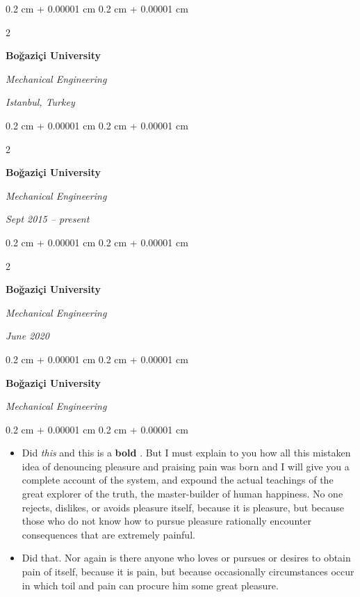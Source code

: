 \documentclass[10pt, letterpaper]{article}
\newenvironment{highlights}{
    \begin{itemize}[
        topsep=0.10 cm,
        parsep=0.10 cm,
        partopsep=0pt,
        itemsep=0pt,
        leftmargin=0.4 cm + 10pt
    ]
}{
    \end{itemize}
} %
\newenvironment{onecolentry}{
    \begin{adjustwidth}{
        0.2 cm + 0.00001 cm
    }{
        0.2 cm + 0.00001 cm
    }
}{
    \end{adjustwidth}
} %
\newenvironment{twocolentry}[2][]{
    \onecolentry
    \def\secondColumn{#2}
    \setcolumnwidth{\fill, 4.5 cm}
    \begin{paracol}{2}
}{
    \switchcolumn \raggedleft \secondColumn
    \end{paracol}
    \endonecolentry
} %
\let\hrefWithoutArrow\href
\renewcommand{\href}[2]{\hrefWithoutArrow{#1}{\ifthenelse{\equal{#2}{}}{ }{#2 }\raisebox{.15ex}{\footnotesize \faExternalLink*}}}
\begin{document}
        \vspace{0.2 cm}

        \begin{twocolentry}{
        \textit{Istanbul, Turkey}    
            
        }
            \textbf{Boğaziçi University}

            \textit{Mechanical Engineering}
        \end{twocolentry}



        \vspace{0.2 cm}

        \begin{twocolentry}{
            
            
        \textit{Sept 2015 – present}}
            \textbf{Boğaziçi University}

            \textit{Mechanical Engineering}
        \end{twocolentry}



        \vspace{0.2 cm}

        \begin{twocolentry}{
            
            
        \textit{June 2020}}
            \textbf{Boğaziçi University}

            \textit{Mechanical Engineering}
        \end{twocolentry}



        \vspace{0.2 cm}

        \begin{onecolentry}
            \textbf{Boğaziçi University}

            \textit{Mechanical Engineering}
        \end{onecolentry}

        \vspace{0.10 cm}
        \begin{onecolentry}
            \begin{highlights}
                \item Did \textit{this} and this is a \textbf{bold} \href{https://example.com}{link}. But I must explain to you how all this mistaken idea of denouncing pleasure and praising pain was born and I will give you a complete account of the system, and expound the actual teachings of the great explorer of the truth, the master-builder of human happiness. No one rejects, dislikes, or avoids pleasure itself, because it is pleasure, but because those who do not know how to pursue pleasure rationally encounter consequences that are extremely painful.
                \item Did that. Nor again is there anyone who loves or pursues or desires to obtain pain of itself, because it is pain, but because occasionally circumstances occur in which toil and pain can procure him some great pleasure.
            \end{highlights}
        \end{onecolentry}
\end{document}
